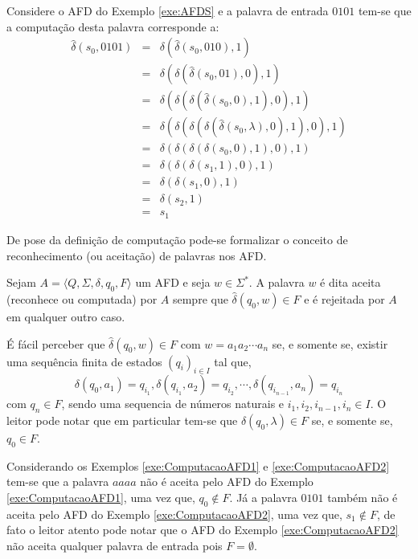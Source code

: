 \begin{exemplo}\label{exe:ComputacaoAFD2}
	Considere o AFD do Exemplo \ref{exe:AFDS} e a palavra de entrada $0101$ tem-se que a computação desta palavra corresponde a:
	\begin{eqnarray*}
		\widehat{\delta}(s_0, 0101) & = & \delta(\widehat{\delta}(s_0, 010), 1)\\
		& = & \delta(\delta(\widehat{\delta}(s_0, 01), 0), 1)\\
		& = & \delta(\delta(\delta(\widehat{\delta}(s_0, 0), 1), 0), 1)\\
		& = & \delta(\delta(\delta(\delta(\widehat{\delta}(s_0, \lambda), 0), 1), 0), 1)\\
		& = & \delta(\delta(\delta(\delta(s_0, 0), 1), 0), 1)\\
		& = & \delta(\delta(\delta(s_1, 1), 0), 1)\\
		& = & \delta(\delta(s_1, 0), 1)\\
		& = & \delta(s_2, 1)\\
		& = & s_1
	\end{eqnarray*}
\end{exemplo}

De pose da definição de computação pode-se formalizar o conceito de reconhecimento (ou aceitação) de palavras nos AFD.

\begin{definicao}\label{defi:PalavraAceitaPorAFD}
	\cite{benjaLivro2010} Sejam $A = \langle Q, \Sigma, \delta, q_0, F\rangle$ um AFD e seja $w \in \Sigma^*$. A palavra $w$ é dita aceita (reconhece ou computada) por $A$ sempre que $\widehat{\delta}(q_0, w) \in F$ e é rejeitada por $A$ em qualquer outro caso.
\end{definicao}

É fácil perceber que $\widehat{\delta}(q_0, w) \in F$ com $w = a_1a_2\cdots a_n$ se, e somente se, existir uma sequência finita de estados $(q_i)_{i \in I}$ tal que, 
$$\delta(q_0, a_1) = q_{i_1}, \delta(q_{i_1}, a_2) = q_{i_2}, \cdots, \delta(q_{i_{n-1}}, a_{n}) = q_{i_n}$$ 
com $q_n \in F$, sendo uma sequencia de números naturais e $i_1, i_2, i_{n-1}, i_n \in I$. O leitor pode notar que em particular tem-se que $\widehat{\delta}(q_0, \lambda) \in F$ se, e somente se, $q_0 \in F$.

\begin{exemplo}\label{exe:AceiteAFD1}
	Considerando os Exemplos \ref{exe:ComputacaoAFD1} e \ref{exe:ComputacaoAFD2} tem-se que a palavra $aaaa$ não é aceita pelo AFD do Exemplo \ref{exe:ComputacaoAFD1}, uma vez que, $q_0 \notin F$. Já a palavra $0101$ também não é aceita pelo AFD do Exemplo \ref{exe:ComputacaoAFD2}, uma vez que, $s_1 \notin F$, de fato o leitor atento pode notar que o AFD do Exemplo \ref{exe:ComputacaoAFD2} não aceita qualquer palavra de entrada pois $F = \emptyset$.
\end{exemplo}

